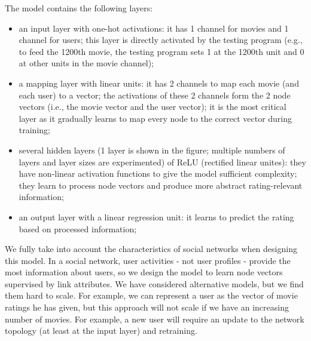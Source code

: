 \documentclass{article}
\begin{document}
The model contains the following layers:
\begin{itemize}
	\item an input layer with one-hot activations: it has 1 channel for movies 
	and 1 channel for users;
	this layer is directly activated by the testing program (e.g., to feed the 
	1200th movie, the testing program sets 1 at the 1200th unit and 0 at other 	
	units in the movie channel);
	\item a mapping layer with linear units: it has 2 channels to map each 
	movie (and each user) to a vector;
	the activations of these 2 channels form the 2 node vectors (i.e., the 
	movie vector and the user vector);
	it is the most critical layer as it gradually learns to map every node to 
	the correct vector during training;
	\item several hidden layers (1 layer is shown in the figure; multiple 
	numbers of layers and layer sizes are experimented) of ReLU 
	(rectified linear unites):
	they have non-linear activation functions to give the model sufficient 
	complexity; 
	they learn to process node vectors and produce more abstract 
	rating-relevant information;
	\item an output layer with a linear regression unit: it learns to predict 
	the rating based on processed information;
\end{itemize}
We fully take into account the characteristics of social networks when 
designing this model.
In a social network, user activities - not user profiles - provide the most 
information about users, so we design the model to learn node vectors 
supervised by link attributes.
We have considered alternative models, but we find them hard to scale.
For example, we can represent a user as the vector of movie ratings he has 
given, 
but this approach will not scale if we have an increasing number of movies.
For example, a new user will require an update to the network topology (at 
least at the input layer) and retraining.
\end{document}

